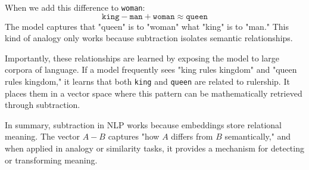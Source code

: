 When we add this difference to \texttt{woman}:
\[
\texttt{king} - \texttt{man} + \texttt{woman} \approx \texttt{queen}
\]
The model captures that "queen" is to "woman" what "king" is to "man." This kind of analogy only works because subtraction isolates semantic relationships.

Importantly, these relationships are learned by exposing the model to large corpora of language. If a model frequently sees "king rules kingdom" and "queen rules kingdom," it learns that both \texttt{king} and \texttt{queen} are related to rulership. It places them in a vector space where this pattern can be mathematically retrieved through subtraction.

In summary, subtraction in NLP works because embeddings store relational meaning. The vector $A - B$ captures "how $A$ differs from $B$ semantically," and when applied in analogy or similarity tasks, it provides a mechanism for detecting or transforming meaning.
